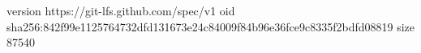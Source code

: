 version https://git-lfs.github.com/spec/v1
oid sha256:842f99e1125764732dfd131673e24c84009f84b96e36fce9c8335f2bdfd08819
size 87540
